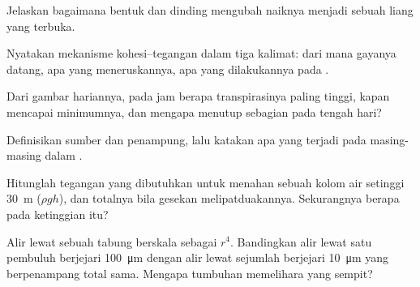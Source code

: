 \begin{exercise}[$\star$]\label{exo:b1:plant-transport:1}
Jelaskan bagaimana bentuk dan dinding  mengubah naiknya
 menjadi sebuah liang yang terbuka.
\end{exercise}

\begin{exercise}[$\star$]\label{exo:b1:plant-transport:2}
Nyatakan mekanisme kohesi--tegangan dalam tiga kalimat: dari mana
gayanya datang, apa yang meneruskannya, apa yang dilakukannya pada
.
\end{exercise}

\begin{exercise}[$\star$]\label{exo:b1:plant-transport:3}
Dari gambar hariannya, pada jam berapa transpirasinya paling tinggi,
kapan   mencapai minimumnya, dan mengapa 
menutup sebagian pada tengah hari?
\end{exercise}

\begin{exercise}[$\star$]\label{exo:b1:plant-transport:4}
Definisikan sumber dan penampung, lalu katakan apa yang terjadi pada
masing-masing dalam .
\end{exercise}

\begin{exercise}[$\star\star$]\label{exo:b1:plant-transport:5}
Hitunglah tegangan yang dibutuhkan untuk menahan sebuah kolom air
setinggi \qty{30}{m} ($\rho g h$), dan totalnya bila gesekan
melipatduakannya. Sekurangnya berapa   pada
ketinggian itu?
\end{exercise}

\begin{exercise}[$\star\star$]\label{exo:b1:plant-transport:6}
Alir lewat sebuah tabung berskala sebagai $r^4$. Bandingkan alir lewat
satu pembuluh berjejari \qty{100}{\micro m} dengan alir lewat sejumlah
 berjejari \qty{10}{\micro m} yang berpenampang total sama.
Mengapa tumbuhan memelihara yang sempit?
\end{exercise}

